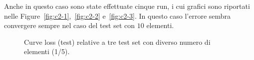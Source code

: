 \documentclass[a4paper,12pt]{article}
\begin{document}
Anche in questo caso sono state effettuate cinque run, i cui grafici sono riportati nelle Figure~\vref{fig:c2-1},~\vref{fig:c2-2} e~\vref{fig:c2-3}. In questo caso l'errore sembra convergere sempre nel caso del test set con $10$ elementi.

\begin{figure}[htb]
    \centering
    \caption{Curve loss (test) relative a tre test set con diverso numero di elementi (1/5).}
    \label{fig:c2-1}
\end{figure}
\end{document}
